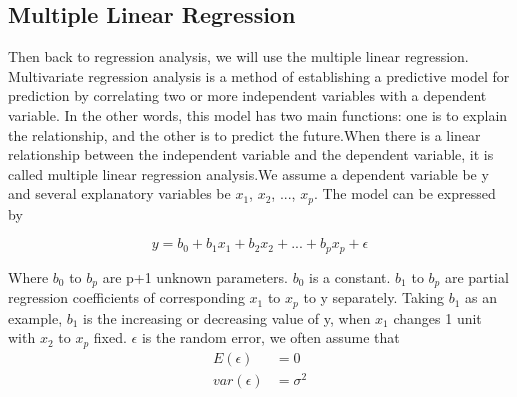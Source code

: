 \documentclass[a4paper]{article}
\begin{document}
\subsection{Multiple Linear Regression}
Then back to regression analysis, we will use the multiple linear regression. Multivariate regression analysis is a method of establishing a predictive model for prediction by correlating two or more independent variables with a dependent variable. In the other words, this model has two main functions: one is to explain the relationship, and the other is to predict the future.When there is a linear relationship between the independent variable and the dependent variable, it is called multiple linear regression analysis.We assume a dependent variable be y and several explanatory variables be $x_1$, $x_2$, ..., $x_p$. The model can be expressed by 
\begin{center}
	\begin{equation*}
	y= b_0+b_1x_1+b_2x_2+...+b_p x_p+\epsilon
	\end{equation*}
\end{center}
Where $b_0$ to $b_p$ are p+1 unknown parameters. $b_0$ is a constant. $b_1$ to $b_p$ are partial regression coefficients of corresponding $x_1$ to $x_p$ to y separately. Taking $b_1$ as an example, $b_1$ is the increasing or decreasing value of y, when $x_1$ changes 1 unit with $x_2$ to $x_p$ fixed. $\epsilon$ is the random error, we often assume that
\begin{equation*}
	\begin{split}
		E(\epsilon) & =0 \\
	var(\epsilon) & =\sigma^2
	\end{split}
\end{equation*}



\end{document}
